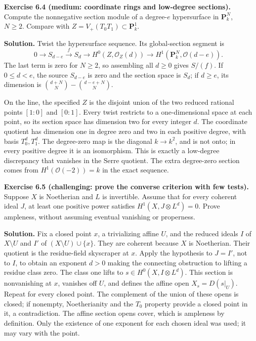 \documentclass[11pt]{article}
\begin{document}
\textbf{Exercise 6.4 (medium: coordinate rings and low-degree
sections).} Compute the nonnegative section module of a degree-\(e\)
hypersurface in \(\mathbf P_k^N\), \(N\ge2\). Compare with
\(Z=V_+(T_0T_1)\subset\mathbf P_k^1\).

\textbf{Solution.} Twist the hypersurface sequence. Its global-section
segment is \[
0\to S_{d-e}\xrightarrow{\ f\ }S_d\to H^0(Z,\mathcal O_Z(d))
\to H^1(\mathbf P_k^N,\mathcal O(d-e)).
\] The last term is zero for \(N\ge2\), so assembling all \(d\ge0\)
gives \(S/(f)\). If \(0\le d<e\), the source \(S_{d-e}\) is zero and the
section space is \(S_d\); if \(d\ge e\), its dimension is
\(\binom{d+N}N-\binom{d-e+N}N\).

On the line, the specified \(Z\) is the disjoint union of the two
reduced rational points \([1:0]\) and \([0:1]\). Every twist restricts
to a one-dimensional space at each point, so its section space has
dimension two for every integer \(d\). The coordinate quotient has
dimension one in degree zero and two in each positive degree, with basis
\(T_0^d,T_1^d\). The degree-zero map is the diagonal \(k\to k^2\), and
is not onto; in every positive degree it is an isomorphism. This is
exactly a low-degree discrepancy that vanishes in the Serre quotient.
The extra degree-zero section comes from \(H^1(\mathcal O(-2))=k\) in
the exact sequence.

\textbf{Exercise 6.5 (challenging: prove the converse criterion with few
tests).} Suppose \(X\) is Noetherian and \(L\) is invertible. Assume
that for every coherent ideal \(J\), at least one positive power
satisfies \(H^1(X,J\otimes L^d)=0\). Prove ampleness, without assuming
eventual vanishing or properness.

\textbf{Solution.} Fix a closed point \(x\), a trivializing affine
\(U\), and the reduced ideals \(I\) of \(X\setminus U\) and \(I'\) of
\((X\setminus U)\cup\{x\}\). They are coherent because \(X\) is
Noetherian. Their quotient is the residue-field skyscraper at \(x\).
Apply the hypothesis to \(J=I'\), not to \(I\), to obtain an exponent
\(d>0\) making the connecting obstruction to lifting a residue class
zero. The class one lifts to \(s\in H^0(X,I\otimes L^d)\). This section
is nonvanishing at \(x\), vanishes off \(U\), and defines the affine
open \(X_s=D(s|_U)\). Repeat for every closed point. The complement of
the union of these opens is closed; if nonempty, Noetherianity and the
\(T_0\) property provide a closed point in it, a contradiction. The
affine section opens cover, which is ampleness by definition. Only the
existence of one exponent for each chosen ideal was used; it may vary
with the point.
\end{document}

